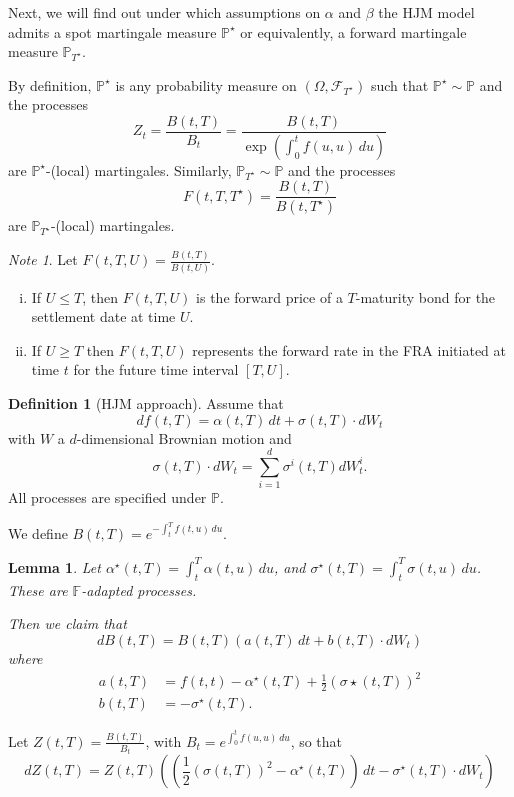 \documentclass[10pt, oneside, reqno]{amsbook}
\theoremstyle{plain}%
\newtheorem{lem}[thm]{Lemma}
\theoremstyle{definition}
\newtheorem{defn}[thm]{Definition}
\theoremstyle{remark}
\newtheorem*{note}{Note}
\newcommand{\sigf}{\mathcal{F}}
\renewcommand{\P}{\mathbb{P}}
\newcommand{\F}{\mathbb{F}}
\numberwithin{equation}{chapter}
\begin{document}
Next, we will find out under which assumptions on $\alpha$ and $\beta$ the HJM model admits a spot martingale measure $\P^\star$ or equivalently, a forward martingale measure $\P_{T^\star}$.  

By definition, $\P^\star$ is any probability measure on $(\Omega, \sigf_{T^\star})$ such that $\P^\star \sim \P$ and the processes \[
	Z_t = \frac{B(t, T)}{B_t} = \frac{B(t, T)}{\exp\left(\int_0^t f(u, u) \, du \right)}
\] are $\P^\star$-(local) martingales.  Similarly, $\P_{T^\star} \sim \P$ and the processes \[
	F(t, T, T^\star) = \frac{B(t, T)}{B(t, T^\star)} 
\] are $\P_{T^\star}$-(local) martingales.

\begin{note}
	Let $F(t, T, U) = \frac{B(t, T)}{B(t, U)}$.
	
	\begin{enumerate}[(i)]
		\item If $U \leq T$, then $F(t, T, U)$ is the forward price of a $T$-maturity bond for the settlement date at time $U$.
		\item If $U \geq T$ then $F(t, T, U)$ represents the forward rate in the FRA initiated at time $t$ for the future time interval $[T,U]$. 
	\end{enumerate}  
\end{note}
	
\begin{defn}[HJM approach]
	Assume that \[
		df(t, T) = \alpha(t, T) \, dt + \sigma(t, T) \cdot dW_t
	\] with $W$ a $d$-dimensional Brownian motion and \[
		\sigma(t, T) \cdot dW_t = \sum_{i=1}^d \sigma^{i}(t, T) dW_t^{i}. 
	\]  All processes are specified under $\P$.  
	
	We define $B(t, T) = e^{-\int_t^T f(t, u) \, du}$.  
\end{defn}


\begin{lem}
	Let $\alpha^\star(t, T) = \int_t^T \alpha(t, u) \, du$, and $\sigma^\star(t, T) = \int_t^T \sigma(t, u) \, du$.  These are $\F$-adapted processes.
	
	Then we claim that \[
		dB(t, T) = B(t, T) \left( a(t, T) \, dt + b(t, T) \cdot dW_t \right)
	\] where \begin{align*}
		a(t, T) &= f(t, t) - \alpha^\star(t, T) + \frac{1}{2} \left(\sigma\star(t, T)\right)^2 \\
		b(t, T) &= - \sigma^\star(t, T).
	\end{align*}
\end{lem}

Let $Z(t, T) = \frac{B(t, T)}{B_t}$, with $B_t = e^{\int_0^t f(u, u) \, du}$, so that \[
	dZ(t, T) = Z(t, T) \left( \left(\frac{1}{2} \left( \sigma(t, T) \right)^2 - \alpha^\star(t, T) \right) \, dt - \sigma^\star(t, T) \cdot dW_t \right) 
\]  
\end{document}

